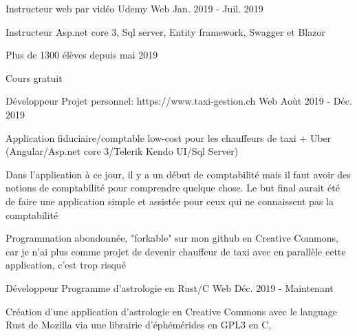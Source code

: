 

\begin{cventries}

  \cventry
    {Instructeur web par vidéo} %
    {Udemy} %
    {Web} %
    {Jan. 2019 - Juil. 2019} %
    {
      \begin{cvitems} %
        \item {Instructeur Asp.net core 3, Sql server, Entity framework, Swagger et Blazor}
        \item {Plus de 1300 élèves depuis mai 2019}
        \item {Cours gratuit}
      \end{cvitems}
    }

  \cventry
    {Développeur} %
    {Projet personnel: https://www.taxi-gestion.ch} %
    {Web} %
    {Aoùt 2019 - Déc. 2019} %
    {
      \begin{cvitems} %
        \item {Application fiduciaire/comptable low-cost pour les chauffeurs de taxi + Uber (Angular/Asp.net core 3/Telerik Kendo UI/Sql Server)}
        \item {Dans l'application à ce jour, il y a un début de comptabilité mais il faut avoir des notions de comptabilité pour comprendre quelque chose. Le but final aurait été de faire une application simple et assistée pour ceux qui ne connaissent pas la comptabilité}
        \item {Programmation abondonnée, "forkable" sur mon github en Creative Commons, car je n'ai plus comme projet de devenir chauffeur de taxi avec en parallèle cette application, c'est trop risqué}
      \end{cvitems}
    }

  \cventry
    {Développeur} %
    {Programme d'astrologie en Rust/C} %
    {Web} %
    {Déc. 2019 - Maintenant} %
    {
      \begin{cvitems} %
        \item {Création d'une application d'astrologie en Creative Commons avec le language Rust de Mozilla via une librairie d'éphémérides en GPL3 en C},
      \end{cvitems}
    }


\end{cventries}
